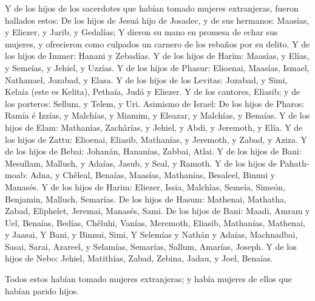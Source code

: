  Y de los hijos de los sacerdotes que habían tomado
mujeres extranjeras, fueron hallados estos: De los hijos de Jesuá hijo
de Josadec, y de sus hermanos: Maasías, y Eliezer, y Jarib, y Gedalías;
 Y dieron su mano en promesa de echar sus mujeres, y
ofrecieron como culpados un carnero de los rebaños por su delito.
 Y de los hijos de Immer: Hanani y Zebadías.
 Y de los hijos de Harím: Maasías, y Elías, y Semeías, y
Jehiel, y Uzzías.  Y de los hijos de Phasur: Elioenai,
Maasías, Ismael, Nathanael, Jozabad, y Elasa.  Y de los
hijos de los Levitas: Jozabad, y Simi, Kelaía (este es Kelita), Pethaía,
Judá y Eliezer.  Y de los cantores, Eliasib; y de los
porteros: Sellum, y Telem, y Uri.  Asimismo de Israel: De
los hijos de Pharos: Ramía é Izzías, y Malchías, y Miamim, y Eleazar, y
Malchías, y Benaías.  Y de los hijos de Elam: Mathanías,
Zachârías, y Jehiel, y Abdi, y Jeremoth, y Elía.  Y de
los hijos de Zattu: Elioenai, Eliasib, Mathanías, y Jeremoth, y Zabad, y
Aziza.  Y de los hijos de Bebai: Johanán, Hananías,
Zabbai, Atlai.  Y de los hijos de Bani: Mesullam,
Malluch, y Adaías, Jasub, y Seal, y Ramoth.  Y de los
hijos de Pahath-moab: Adna, y Chêleal, Benaías, Maasías, Mathanías,
Besaleel, Binnui y Manasés.  Y de los hijos de Harim:
Eliezer, Issia, Malchîas, Semeía, Simeón,  Benjamín,
Malluch, Semarías.  De los hijos de Hasum: Mathenai,
Mathatha, Zabad, Eliphelet, Jeremai, Manasés, Sami.  De
los hijos de Bani: Maadi, Amram y Uel,  Benaías, Bedías,
Chêluhi,  Vanías, Meremoth, Eliasib, 
Mathanías, Mathenai, y Jaasai,  Y Bani, y Binnui, Simi,
 Y Selemías y Nathán y Adaías, 
Machnadbai, Sasai, Sarai,  Azareel, y Selamías, Semarías,
 Sallum, Amarías, Joseph.  Y de los hijos
de Nebo: Jehiel, Matithías, Zabad, Zebina, Jadau, y Joel, Benaías.

 Todos estos habían tomado mujeres extranjeras; y había
mujeres de ellos que habían parido hijos.
